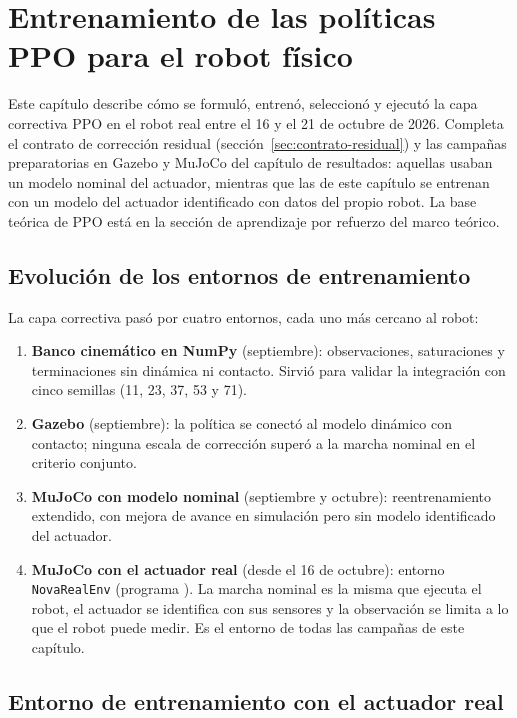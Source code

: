 \chapter{Entrenamiento de las políticas PPO para el robot físico}
\label{cap:ppo-fisico}

Este capítulo describe cómo se formuló, entrenó, seleccionó y ejecutó la capa
correctiva PPO en el robot real entre el 16 y el 21 de octubre de 2026. Completa
el contrato de corrección residual (sección~\ref{sec:contrato-residual}) y las
campañas preparatorias en Gazebo y MuJoCo del capítulo de resultados: aquellas usaban un
modelo nominal del actuador, mientras que las de este capítulo se entrenan con
un modelo del actuador identificado con datos del propio robot. La base teórica
de PPO está en la sección de aprendizaje por refuerzo del marco teórico.

\section{Evolución de los entornos de entrenamiento}

La capa correctiva pasó por cuatro entornos, cada uno más cercano al robot:
\begin{enumerate}
    \item \textbf{Banco cinemático en NumPy} (septiembre): observaciones,
    saturaciones y terminaciones sin dinámica ni contacto. Sirvió para validar
    la integración con cinco semillas (11, 23, 37, 53 y 71).
    \item \textbf{Gazebo} (septiembre): la política se conectó al modelo
    dinámico con contacto; ninguna escala de corrección superó a la marcha
    nominal en el criterio conjunto.
    \item \textbf{MuJoCo con modelo nominal} (septiembre y octubre):
    reentrenamiento extendido, con mejora de avance en simulación pero sin
    modelo identificado del actuador.
    \item \textbf{MuJoCo con el actuador real} (desde el 16 de octubre): entorno
    \texttt{NovaRealEnv} (programa ).
    La marcha nominal es la misma que ejecuta el robot, el actuador se
    identifica con sus sensores y la observación se limita a lo que el robot
    puede medir. Es el entorno de todas las campañas de este capítulo.
\end{enumerate}

\section{Entorno de entrenamiento con el actuador real}

